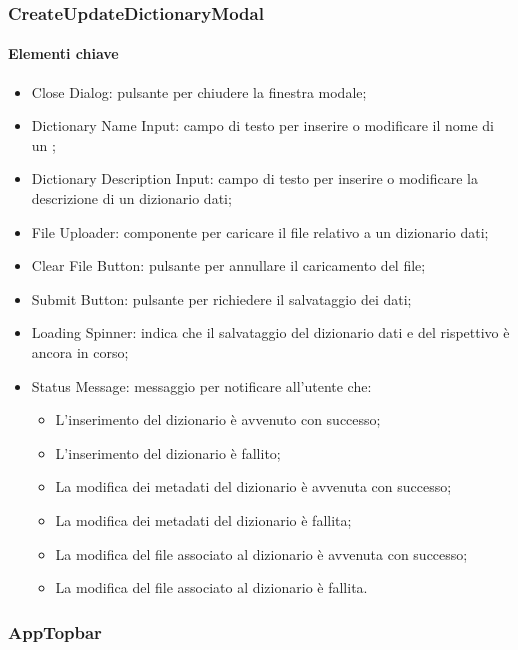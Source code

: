 \subsubsection{CreateUpdateDictionaryModal}

\paragraph*{Elementi chiave}
\begin{itemize}
  \item Close Dialog: pulsante per chiudere la finestra modale;
  \item Dictionary Name Input: campo di testo per inserire o modificare il nome di un ;
  \item Dictionary Description Input: campo di testo per inserire o modificare la descrizione di un dizionario dati;
  \item File Uploader: componente per caricare il file relativo a un dizionario dati;
  \item Clear File Button: pulsante per annullare il caricamento del file;
  \item Submit Button: pulsante per richiedere il salvataggio dei dati;
  \item Loading Spinner: indica che il salvataggio del dizionario dati e del rispettivo  è ancora in corso;
  \item Status Message: messaggio per notificare all'utente che:
  \begin{itemize}
    \item L'inserimento del dizionario è avvenuto con successo;
    \item L'inserimento del dizionario è fallito;
    \item La modifica dei metadati del dizionario è avvenuta con successo;
    \item La modifica dei metadati del dizionario è fallita;
    \item La modifica del file associato al dizionario è avvenuta con successo;
    \item La modifica del file associato al dizionario è fallita.
  \end{itemize}
\end{itemize}

\subsubsection{AppTopbar}

